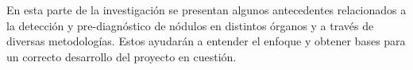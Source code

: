 En esta parte de la investigación se presentan algunos antecedentes relacionados a la detección y pre-diagnóstico de nódulos en distintos órganos y a través de diversas metodologías. Estos ayudarán a entender el enfoque y obtener bases para un correcto desarrollo del proyecto en cuestión.






